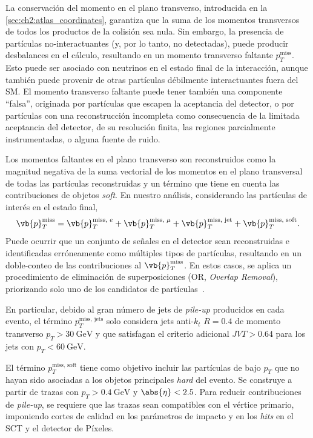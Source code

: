La conservación del momento en el plano transverso, introducida en la \cref{sec:ch2:atlas_coordinates}, garantiza que la suma de los momentos transversos de todos los productos de la colisión sea nula. Sin embargo, la presencia de partículas no-interactuantes (y, por lo tanto, no detectadas), puede producir desbalances en el cálculo, resultando en un momento transverso faltante $p_T^{\text{miss}}$. Esto puede ser asociado con neutrinos en el estado final de la interacción, aunque también puede provenir de otras partículas débilmente interactuantes fuera del SM. El momento transverso faltante puede tener también una componente ``falsa'', originada por partículas que escapen la aceptancia del detector, o por partículas con una reconstrucción incompleta como consecuencia de la limitada aceptancia del detector, de su resolución finita, las regiones parcialmente instrumentadas, o alguna fuente de ruido.

Los momentos faltantes en el plano transverso son reconstruidos como la magnitud negativa de la suma vectorial de los momentos en el plano transversal de todas las partículas reconstruidas y un término que tiene en cuenta las contribuciones de objetos \textit{soft}. En nuestro análisis, considerando las partículas de interés en el estado final,
\[ \vb{p}_T^{\text{miss}} = \vb{p}_T^{\text{miss, }e} + \vb{p}_T^{\text{miss, }\mu} + \vb{p}_T^{\text{miss, jet}} + \vb{p}_T^{\text{miss, soft}}. \]
Puede ocurrir que un conjunto de señales en el detector sean reconstruidas e identificadas erróneamente como múltiples tipos de partículas, resultando en un doble-conteo de las contribuciones al $\vb{p}_T^{\text{miss}}$. En estos casos, se aplica un procedimiento de eliminación de superposiciones (OR, \textit{Overlap Removal}), priorizando solo uno de los candidatos de partículas~\cite[-9em][]{TheATLASCollaboration2018}.

En particular, debido al gran número de jets de \textit{pile-up} producidos en cada evento, el término $p_T^{\text{miss, jets}}$ solo considera jets anti-$k_t$ $R = 0.4$ de momento transverso $p_T > \SI{30}{\GeV}$ y que satisfagan el criterio adicional $JVT > 0.64$ para los jets con $p_T < \SI{60}{\GeV}$.

El término $p_T^{\text{miss, soft}}$ tiene como objetivo incluir las partículas de bajo $p_T$ que no hayan sido asociadas a los objetos principales \textit{hard} del evento. Se construye a partir de trazas con $p_T > \SI{0.4}{\GeV}$ y $\abs{\eta} < 2.5$. Para reducir contribuciones de \textit{pile-up}, se requiere que las trazas sean compatibles con el vértice primario, imponiendo cortes de calidad en los parámetros de impacto y en los \textit{hits} en el SCT y el detector de Píxeles.

